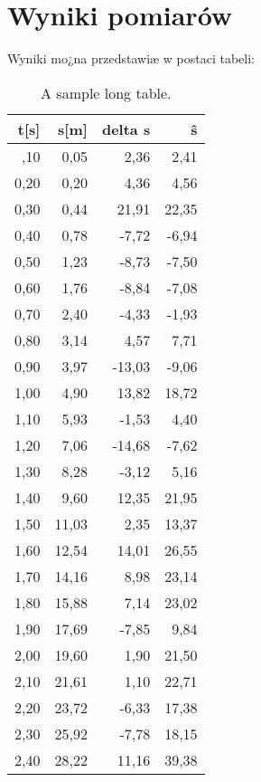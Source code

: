 \documentclass{article}
\begin{document}
\section{Wyniki pomiarów}
Wyniki mo¿na przedstawiæ w postaci tabeli:
\begin{center}
\begin{longtable}{r|r|r|r}
\caption{A sample long table.} \label{tab:long} \\

 \multicolumn{1}{r|}{\textbf{t[s]}} & \multicolumn{1}{r|}{\textbf{s[m]}} &  \multicolumn{1}{r|}{\textbf{delta s}} & \multicolumn{1}{|r}{\textbf{\^s}} \\ \hline
\endfirsthead

\endlastfoot
0,10 & 0,05 & 2,36 & 2,41 \\
        0,20 & 0,20 & 4,36 & 4,56 \\
        0,30 & 0,44 & 21,91 & 22,35 \\
        0,40 & 0,78 & -7,72 & -6,94 \\
        0,50 & 1,23 & -8,73 & -7,50 \\
        0,60 & 1,76 & -8,84 & -7,08 \\
        0,70 & 2,40 & -4,33 & -1,93 \\
        0,80 & 3,14 & 4,57 & 7,71 \\
        0,90 & 3,97 & -13,03 & -9,06 \\
        1,00 & 4,90 & 13,82 & 18,72 \\
        1,10 & 5,93 & -1,53 & 4,40 \\
        1,20 & 7,06 & -14,68 & -7,62 \\
        1,30 & 8,28 & -3,12 & 5,16 \\
        1,40 & 9,60 & 12,35 & 21,95 \\
        1,50 & 11,03 & 2,35 & 13,37 \\
        1,60 & 12,54 & 14,01 & 26,55 \\
        1,70 & 14,16 & 8,98 & 23,14 \\
        1,80 & 15,88 & 7,14 & 23,02 \\
        1,90 & 17,69 & -7,85 & 9,84 \\
        2,00 & 19,60 & 1,90 & 21,50 \\
        2,10 & 21,61 & 1,10 & 22,71 \\
        2,20 & 23,72 & -6,33 & 17,38 \\
        2,30 & 25,92 & -7,78 & 18,15 \\
        2,40 & 28,22 & 11,16 & 39,38 \\

\end{longtable}
\end{center}
\end{document}
